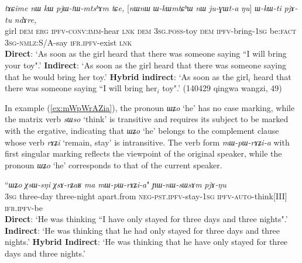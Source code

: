 \documentclass[oneside,a4paper,11pt]{article}
\newcommand{\ipa}[1]{\textit{\phon#1}}
\newcommand{\jpg}[2]{\ipa{#1} `#2'}
\newcommand{\bleu}[1]{{\color{blue}#1}}
\newcommand{\rouge}[1]{{\color{red}#1}}
\newcommand{\refb}[1]{(\ref{#1})}
\begin{document}
\begin{exe}
\ex \label{ex:juGWta}
\gll   \ipa{tɤɕime}  	\ipa{nɯ}  	\ipa{kɯ}  	\ipa{pjɯ-tɯ-mtsʰɤm}  	\ipa{tɕe,}  	[\ipa{nɯnɯ}  \rouge{\ipa{ɯ-kɯmtɕʰɯ}}  	\ipa{nɯ}  	\bleu{\ipa{ju-ɣɯt-a}}  	\ipa{ŋu}]  		\ipa{ɯ-kɯ-ti}  	\ipa{pjɤ-tu}  	\ipa{ndɤre,}  \\
girl \textsc{dem} \textsc{erg} \textsc{ipfv-conv:imm}-hear \textsc{lnk} \textsc{dem} {\textsc{3sg.poss}-toy} \textsc{dem} {\textsc{ipfv}-bring-\textsc{1sg}}  be:\textsc{fact} \textsc{3sg-nmlz}:S/A-say \textsc{ifr.ipfv}-exist \textsc{lnk} \\
\glt   \textbf{Direct}: `As soon as the girl heard that there was someone saying ``\bleu{I will bring your toy}".'
\glt   \textbf{Indirect}:  `As soon as the girl heard that there was someone saying that \rouge{he would bring her toy}.'
\glt   \textbf{Hybrid indirect}: `As soon as the girl$_i$ heard that there was someone saying ``\bleu{I will bring} \rouge{her$_i$ toy}".' (140429 qingwa wangzi, 49)
\end{exe}


In example \refb{ex:mWpWrAZia}, the pronoun \jpg{ɯʑo}{he} has no case marking, while the matrix verb \jpg{sɯso}{think} is transitive and requires its subject to be marked with the ergative, indicating that \jpg{ɯʑo}{he} belongs to the complement clause whose verb \jpg{rɤʑi}{remain, stay} is intransitive. The verb form \ipa{mɯ-pɯ-rɤʑi-a} with first singular marking reflects the viewpoint of the original speaker, while the pronoun \jpg{ɯʑo}{he} corresponds to that of the current speaker. 
  
\begin{exe}
\ex \label{ex:mWpWrAZia}
\gll  ``\bleu{\ipa{ɯʑo}}  	\ipa{χsɯ-sŋi}  	\ipa{χsɤ-rʑaʁ}  	\ipa{ma}  	\rouge{\ipa{mɯ-pɯ-rɤʑi-a}}"  	\ipa{ɲɯ-nɯ-sɯsɤm}  	\ipa{pjɤ-ŋu}  \\
{\textsc{3sg}} three-day  three-night apart.from {\textsc{neg-pst.ipfv}-stay-\textsc{1sg}} \textsc{ipfv-auto}-think[III] \textsc{ifr.ipfv}-be \\
\glt    \textbf{Direct}: `He was thinking ``\bleu{I have only stayed} for three days and three nights".'
\glt    \textbf{Indirect}: `He was thinking that \rouge{he had only stayed} for three days and three nights.'
\glt  \textbf{Hybrid Indirect}: `He was thinking that \rouge{he} \bleu{have only stayed} for three days and three nights.' 
\end{exe}
  
\end{document}
